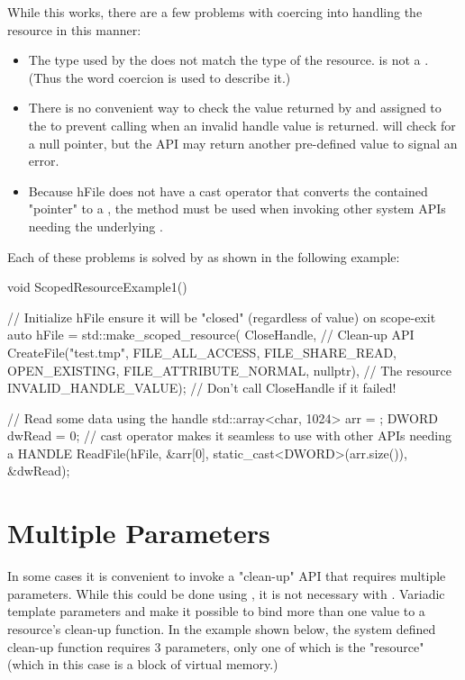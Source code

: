\documentclass[ebook,11pt,article]{memoir}
\begin{document}
While this works, there are a few problems with coercing  into handling the resource in this manner:
\begin{itemize}
\item The type used by the  does not match the type of the resource.   is not a .  (Thus the word coercion is used to describe it.)
\item There is no convenient way to check the value returned by  and assigned to the  to prevent calling  when an invalid handle value is returned.   will check for a null pointer, but the  API may return another pre-defined value to signal an error.
\item Because hFile does not have a cast operator that converts the contained "pointer" to a , the  method must be used when invoking other system APIs needing the underlying .
\end{itemize}

Each of these problems is solved by  as shown in the following example:

\begin{codeblock}
void ScopedResourceExample1()
{
	// Initialize hFile ensure it will be "closed" (regardless of value) on scope-exit
	auto hFile = std::make_scoped_resource(
		CloseHandle,				// Clean-up API
		CreateFile("test.tmp", 
			FILE_ALL_ACCESS, 
			FILE_SHARE_READ, 
			OPEN_EXISTING, 
			FILE_ATTRIBUTE_NORMAL,
			nullptr), 			// The resource
		INVALID_HANDLE_VALUE);	// Don't call CloseHandle if it failed!

	// Read some data using the handle
	std::array<char, 1024> arr = { };
	DWORD dwRead = 0;
	// cast operator makes it seamless to use with other APIs needing a HANDLE
	ReadFile(hFile,
		&arr[0], 
		static_cast<DWORD>(arr.size()), 
		&dwRead);
}
\end{codeblock}

\section{Multiple Parameters}
In some cases it is convenient to invoke a "clean-up" API that requires multiple parameters.  While this could be done using , it is not necessary with .  Variadic template parameters and  make it possible to bind more than one value to a resource's clean-up function.  In the example shown below, the system defined clean-up function  requires 3 parameters, only one of which is the "resource" (which in this case is a block of virtual memory.)
\end{document}
